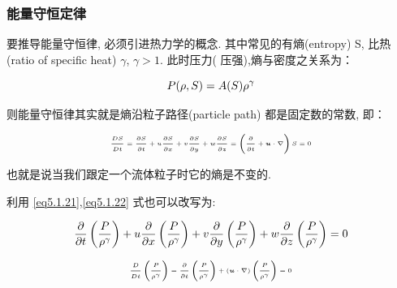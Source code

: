 \documentclass[aspectratio=2516]{beamer}
\begin{document}

\begin{frame}
\frametitle{\kaishu 能量守恒定律}

\kaishu 

\small 
 
要推导能量守恒律, 必须引进热力学的概念. 其中常见的有熵(entropy) S, 比热(ratio of specific heat) $ \gamma $, $ \gamma > 1 $. 此时压力({\color{red} 压强}),熵与密度之关系为：

\begin{equation}
\tiny 
P(\rho, S) = A(S) \rho^{\gamma}
\label{eq5.1.21}
\end{equation}

则能量守恒律其实就是熵沿粒子路径(particle path) 都是固定数的常数, 即：

\begin{equation}
\tiny 
\frac{{DS}}{{Dt}} = \frac{{\partial S}}{{\partial t}} + u\frac{{\partial S}}{{\partial x}} + v\frac{{\partial S}}{{\partial y}} + w\frac{{\partial S}}{{\partial z}} = \left( {\frac{\partial }{{\partial t}} + \boldsymbol{u} \cdot \nabla } \right)S = 0
\label{eq5.1.22}
\end{equation}

也就是说当我们跟定一个流体粒子时它的熵是不变的.

\vspace{0.15cm}

利用 \ref{eq5.1.21},\ref{eq5.1.22} 式也可以改写为:

\begin{equation}
\tiny
\frac{\partial }{{\partial t}}\left( {\frac{P}{{{\rho ^\gamma }}}} \right) + u\frac{\partial }{{\partial x}}\left( {\frac{P}{{{\rho ^\gamma }}}} \right) + v\frac{\partial }{{\partial y}}\left( {\frac{P}{{{\rho ^\gamma }}}} \right) + w\frac{\partial }{{\partial z}}\left( {\frac{P}{{{\rho ^\gamma }}}} \right) = 0
\label{eq5.1.23}
\end{equation}

\begin{equation}
\tiny
\frac{D}{{Dt}}\left( {\frac{P}{{{\rho ^\gamma }}}} \right) = \frac{\partial }{{\partial t}}\left( {\frac{P}{{{\rho ^\gamma }}}} \right) + \left( {\boldsymbol{u} \cdot \nabla } \right)\left( {\frac{P}{{{\rho ^\gamma }}}} \right) = 0
\label{eq5.1.24}
\end{equation}

\end{frame}
\end{document}

